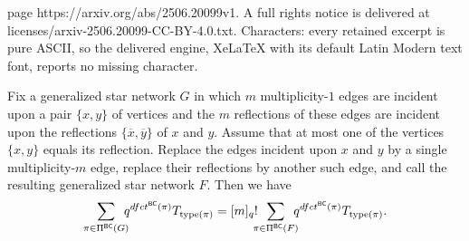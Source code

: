 \documentclass[10pt,a4paper]{amsart}
\newcommand{\PiBC}{\Pi^{\msfBC}}
\newcommand{\dfct}{\textsc{dfct}}
\newcommand{\msfBC}{\mathsf{BC}}
\newcommand{\nTksp}{\negthickspace\negthickspace}
\newcommand{\ol}[1]{\overline{#1}}
\newcommand{\type}{\mathrm{type}}
\begin{document}
page https://arxiv.org/abs/2506.20099v1. A full rights notice is delivered at licenses/arxiv-2506.20099-CC-BY-4.0.txt. Characters: every retained excerpt is pure ASCII, so the delivered engine, XeLaTeX with its default Latin Modern text font, reports no missing character.
\begin{lem}\label{l:collapse}
Fix a generalized star network $G$ in which $m$ multiplicity-$1$ edges are incident upon a pair $\{x,y\}$ of vertices and the $m$ reflections of these edges are incident upon the reflections $\{\ol x, \ol y\}$ of $x$ and $y$. Assume that at most one of the vertices $\{ x, y \}$ equals its reflection. Replace the edges incident upon $x$ and $y$
by a single multiplicity-$m$ edge,
replace their reflections by another such edge, and call the resulting generalized star network $F$.
Then we have
\begin{equation}\label{eq:mto1}
        \sum_{\pi \in \PiBC(G)} \nTksp q^{\dfct^{\msfBC}(\pi)} T_{\type(\pi)} = 
    [m]_q! \nTksp
    \sum_{\pi \in \PiBC(F)} \nTksp q^{\dfct^{\msfBC}(\pi)} T_{\type(\pi)}.
\end{equation}
\end{lem}
\end{document}
